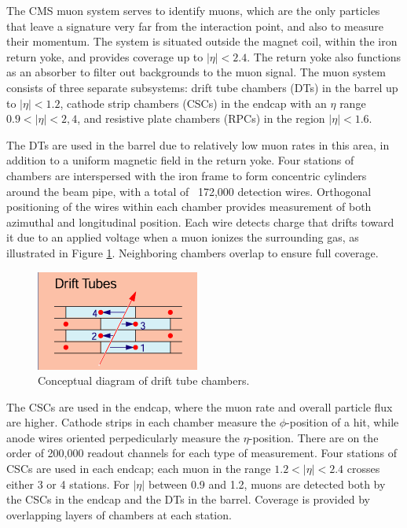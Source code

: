 The CMS muon system serves to identify muons, 
which are the only particles that leave a signature 
very far from the interaction point,
and also to measure their momentum.  
The system is situated outside the magnet coil, 
within the iron return yoke, 
and provides coverage up to $|\eta| < 2.4$.  
The return yoke also functions as an absorber 
to filter out backgrounds to the muon signal.  
The muon system consists of three separate subsystems: 
drift tube chambers (DTs) in the barrel up to $|\eta| < 1.2$, 
cathode strip chambers (CSCs) in the endcap 
with an $\eta$ range $ 0.9 < |\eta| < 2,4$, 
and resistive plate chambers (RPCs) %
in the region $ |\eta| < 1.6$.  

The DTs are used in the barrel due to 
relatively low muon rates in this area, 
in addition to a uniform magnetic field in the 
return yoke.  
Four stations of chambers are interspersed 
with the iron frame to form
concentric cylinders around the beam pipe, 
with a total of ~172,000 detection wires.  
Orthogonal positioning of the wires 
within each chamber provides measurement of 
both azimuthal and longitudinal position.  
Each wire detects charge that drifts toward it 
due to an applied voltage when a muon ionizes 
the surrounding gas, as illustrated in 
Figure \ref{fig:DTconcept}.  
Neighboring chambers overlap 
to ensure full coverage.  

 \begin{figure}[htb]
  \begin{center}
    \includegraphics[]{Figures/muon-DT-concept.png}
  \end{center}
  \caption[Conceptual diagram of drift tube chambers]{Conceptual diagram of drift tube chambers.}
  \label{fig:DTconcept}
 \end{figure}

The CSCs are used in the endcap, 
where the muon rate and overall particle flux 
are higher.  
Cathode strips in each chamber 
measure the $\phi$-position of a hit, 
while anode wires oriented perpedicularly measure 
the $\eta$-position.  
There are on the order of 200,000 readout channels 
for each type of measurement.  
Four stations of CSCs are used in each endcap; 
each muon in the range $1.2 < |\eta| <2.4$ crosses either 
3 or 4 stations.  
For $|\eta|$ between 0.9 and 1.2, muons are detected 
both by the CSCs in the endcap and the DTs in the barrel.  
Coverage is provided by overlapping layers of chambers 
at each station.  

